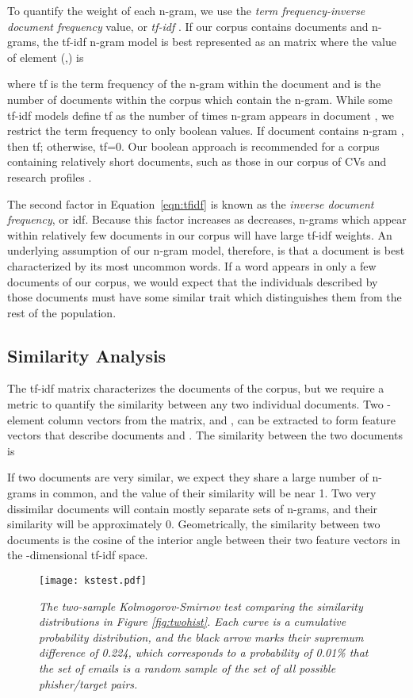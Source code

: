\documentclass[conference]{IEEEtran}
\begin{document}
To quantify the weight of each n-gram, we use the \emph{term frequency-inverse document frequency} value, or \emph{tf-idf}
\cite{salton1983introduction}.  If our corpus contains  documents and  n-grams, the tf-idf n-gram model is 
best represented as an  matrix where the value of element (,) is

where tf is the term frequency of the  n-gram within the  document and  is the number of documents within the corpus which contain the  n-gram.  While some tf-idf models 
define tf as the number of times n-gram  appears in document , we restrict the term frequency to only boolean values.  If document  contains n-gram , then tf; otherwise, tf=0.  
Our boolean approach is recommended for a corpus containing relatively short documents, such as those in our corpus of CVs and research profiles \cite{salton1988term}.

The second factor in Equation~\ref{eqn:tfidf} is known as the \emph{inverse document frequency}, or idf.  Because this factor increases as  decreases, n-grams which appear within relatively few 
documents in our corpus will have large tf-idf weights.  An underlying assumption of our n-gram model, therefore, is that a document is best characterized by its most uncommon words.  If a word appears in only a few documents of our corpus, we would expect that the individuals described by those documents must have some similar trait which distinguishes them from the rest of the 
population.

\subsection{Similarity Analysis}
The  tf-idf matrix characterizes the documents of the corpus, but we require a metric to quantify the similarity between any two individual documents.  
Two -element column vectors from the matrix,  and , can be extracted to form feature vectors 
that describe documents  and .  The similarity between the two documents is

If two documents are very similar, we expect they share a large number of n-grams in common, and the value of their similarity will be near 1.  Two very dissimilar documents will contain 
mostly separate sets of n-grams, and their similarity will be approximately 0.  Geometrically, the similarity between two documents is the cosine of the interior angle between their two feature vectors in the 
-dimensional tf-idf space.
\begin{figure}[t!]
 \begin{center}
  \texttt{[image: kstest.pdf]}
  \caption{\sl The two-sample Kolmogorov-Smirnov test comparing the similarity distributions in Figure \ref{fig:twohist}.  Each curve is a cumulative probability distribution, and the black arrow marks their 
  supremum 
difference of 0.224, which corresponds to a probability of 0.01\% that the set of emails is a random sample of the set of all possible phisher/target pairs. \label{fig:kstest}}
 \end{center}
\end{figure}
\end{document}
